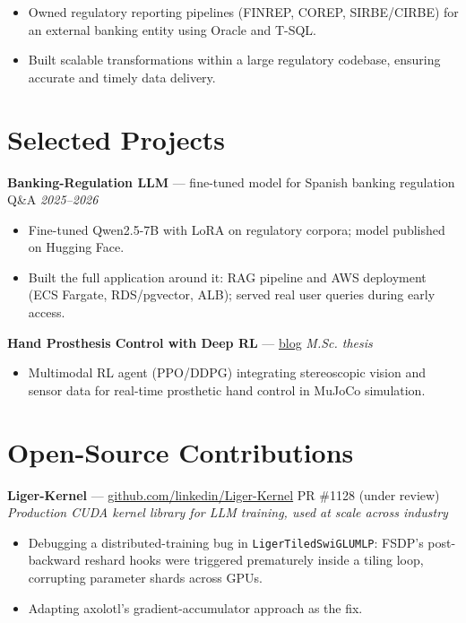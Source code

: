 \documentclass[10pt,a4paper]{article}
\begin{document}
\vspace{4pt}
\begin{itemize}
  \item Owned regulatory reporting pipelines (FINREP, COREP, SIRBE/CIRBE) for an external banking entity using Oracle and T-SQL.
  \item Built scalable transformations within a large regulatory codebase, ensuring accurate and timely data delivery.
\end{itemize}

\section{Selected Projects}

\noindent
\textbf{Banking-Regulation LLM} --- fine-tuned model for Spanish banking regulation Q\&A \hfill \textit{2025--2026}
\begin{itemize}
  \item Fine-tuned Qwen2.5-7B with LoRA on regulatory corpora; model published on Hugging Face. %
  \item Built the full application around it: RAG pipeline and AWS deployment (ECS Fargate, RDS/pgvector, ALB); served real user queries during early access.
\end{itemize}

\vspace{4pt}
\noindent
\textbf{Hand Prosthesis Control with Deep RL} --- \href{https://alektebel.github.io/blog/master-thesis-reinforcement-learning.html}{blog} \hfill \textit{M.Sc. thesis}
\begin{itemize}
  \item Multimodal RL agent (PPO/DDPG) integrating stereoscopic vision and sensor data for real-time prosthetic hand control in MuJoCo simulation.
\end{itemize}

\section{Open-Source Contributions}

\noindent
\textbf{Liger-Kernel} --- \href{https://github.com/linkedin/Liger-Kernel}{github.com/linkedin/Liger-Kernel} \hfill PR \#1128 (under review)\\
\textit{Production CUDA kernel library for LLM training, used at scale across industry}
\begin{itemize}
  \item Debugging a distributed-training bug in \texttt{LigerTiledSwiGLUMLP}: FSDP's post-backward reshard hooks were triggered prematurely inside a tiling loop, corrupting parameter shards across GPUs.
  \item Adapting axolotl's gradient-accumulator approach as the fix.
\end{itemize}
\end{document}
